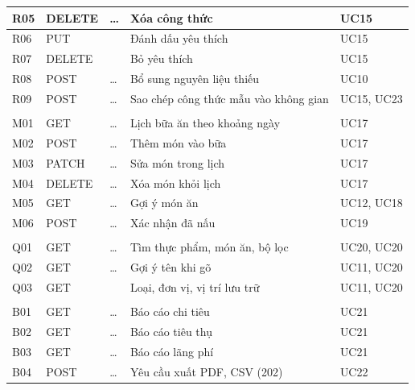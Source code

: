 {\begin{longtable}{|C{0.8cm}|C{1.8cm}|L{5.4cm}|L{\dimexpr{}\arrayrulewidth-0.8cm-1.8cm-5.4cm-1.85cm\relax}|C{1.85cm}|}
R05 & DELETE & \ldots{} & Xóa công thức & UC15\\ \hline
R06 & PUT &  & Đánh dấu yêu thích & UC15\\ \hline
R07 & DELETE &  & Bỏ yêu thích & UC15\\ \hline
R08 & POST & \ldots{} & Bổ sung nguyên liệu thiếu & UC10\\ \hline
R09 & POST & \ldots{} & Sao chép công thức mẫu vào không gian & UC15, UC23\\ \hline
{}\\ \hline
M01 & GET & \ldots{} & Lịch bữa ăn theo khoảng ngày & UC17\\ \hline
M02 & POST & \ldots{} & Thêm món vào bữa & UC17\\ \hline
M03 & PATCH & \ldots{} & Sửa món trong lịch & UC17\\ \hline
M04 & DELETE & \ldots{} & Xóa món khỏi lịch & UC17\\ \hline
M05 & GET & \ldots{} & Gợi ý món ăn & UC12, UC18\\ \hline
M06 & POST & \ldots{} & Xác nhận đã nấu & UC19\\ \hline
{}\\ \hline
Q01 & GET & \ldots{} & Tìm thực phẩm, món ăn, bộ lọc & UC20, UC20\\ \hline
Q02 & GET & \ldots{} & Gợi ý tên khi gõ & UC11, UC20\\ \hline
Q03 & GET &  & Loại, đơn vị, vị trí lưu trữ & UC11, UC20\\ \hline
{}\\ \hline
B01 & GET & \ldots{} & Báo cáo chi tiêu & UC21\\ \hline
B02 & GET & \ldots{} & Báo cáo tiêu thụ & UC21\\ \hline
B03 & GET & \ldots{} & Báo cáo lãng phí & UC21\\ \hline
B04 & POST & \ldots{} & Yêu cầu xuất PDF, CSV (202) & UC22\\ \hline

\end{longtable}}
